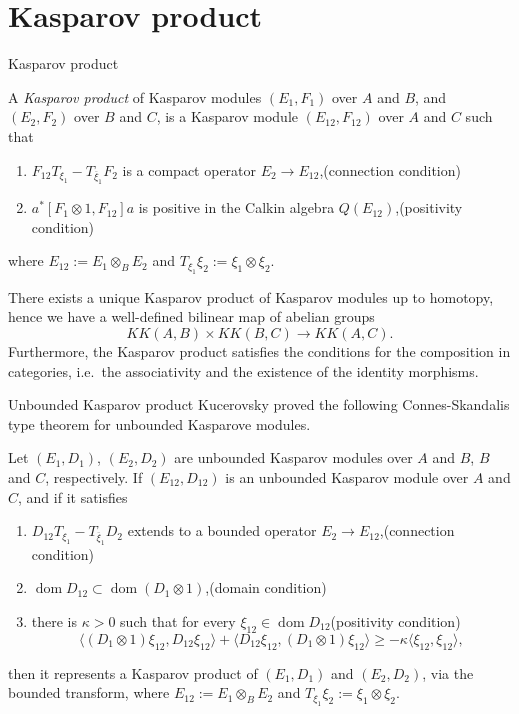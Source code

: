 \documentclass[handout]{../../../slide}
\begin{document}
\section{Kasparov product}
\contents


\begin{frame}{Kasparov product}
\begin{defn}[\cite{MR775126}]
A \emph{Kasparov product} of Kasparov modules $(E_1,F_1)$ over $A$ and $B$, and $(E_2,F_2)$ over $B$ and $C$, is a Kasparov module $(E_{12},F_{12})$ over $A$ and $C$ such that
\begin{enumerate}
\item $F_{12}T_{\xi_1}-T_{\overline\xi_1}F_2$ is a compact operator $E_2\to E_{12}$,\hfill(connection condition)
\item $a^*[F_1\otimes1,F_{12}]a$ is positive in the Calkin algebra $Q(E_{12})$,\hfill(positivity condition)
\end{enumerate}
where $E_{12}:=E_1\otimes_BE_2$ and $T_{\xi_1}\xi_2:=\xi_1\otimes\xi_2$.
\end{defn}
\pause
\begin{prop}
There exists a unique Kasparov product of Kasparov modules up to homotopy, hence we have a well-defined bilinear map of abelian groups
\[KK(A,B)\times KK(B,C)\to KK(A,C).\]
Furthermore, the Kasparov product satisfies the conditions for the composition in categories, i.e.~the associativity and the existence of the identity morphisms.
\end{prop}
\end{frame}



\begin{frame}{Unbounded Kasparov product}
Kucerovsky proved the following Connes-Skandalis type theorem for unbounded Kasparove modules.
\pause
\begin{thm}[\cite{MR1435704}]
Let $(E_1,D_1)$, $(E_2,D_2)$ are unbounded Kasparov modules over $A$ and $B$, $B$ and $C$, respectively.
If $(E_{12},D_{12})$ is an unbounded Kasparov module over $A$ and $C$, and if it satisfies
\begin{enumerate}
\item $D_{12}T_{\xi_1}-T_{\overline\xi_1}D_2$ extends to a bounded operator $E_2\to E_{12}$,\hfill(connection condition)
\item $\operatorname{dom}D_{12}\subset\operatorname{dom}(D_1\otimes1)$,\hfill(domain condition)
\item there is $\kappa>0$ such that for every $\xi_{12}\in\operatorname{dom}D_{12}$\hfill(positivity condition)
\[\langle(D_1\otimes1)\xi_{12},D_{12}\xi_{12}\rangle+\langle D_{12}\xi_{12},(D_1\otimes1)\xi_{12}\rangle\ge-\kappa\langle\xi_{12},\xi_{12}\rangle,\]
\end{enumerate}
then it represents a Kasparov product of $(E_1,D_1)$ and $(E_2,D_2)$, via the bounded transform, where $E_{12}:=E_1\otimes_BE_2$ and $T_{\xi_1}\xi_2:=\xi_1\otimes\xi_2$.
\end{thm}
\end{frame}
\end{document}
